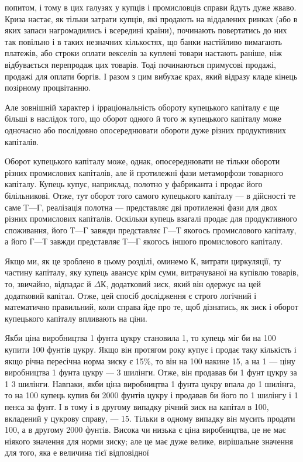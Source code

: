 \parcont{}  %
попитом, і тому в цих галузях у купців і промисловців справи
йдуть дуже жваво. Криза настає, як тільки затрати купців, які
продають на віддалених ринках (або в яких запаси нагромадились
і всередині країни), починають повертатись до них так
повільно і в таких незначних кількостях, що банки настійливо
вимагають платежів, або строки оплати векселів за куплені
товари настають раніше, ніж відбувається перепродаж цих
товарів. Тоді починаються примусові продажі, продажі для
оплати боргів. І разом з цим вибухає крах, який відразу кладе
кінець позірному процвітанню.

Але зовнішній характер і ірраціональність обороту купецького
капіталу є ще більші в наслідок того, що оборот одного й того ж
купецького капіталу може одночасно або послідовно опосереднювати
обороти дуже різних продуктивних капіталів.

Оборот купецького капіталу може, однак, опосереднювати
не тільки обороти різних промислових капіталів, але й протилежні
фази метаморфози товарного капіталу. Купець купує,
наприклад, полотно у фабриканта і продає його білільникові.
Отже, тут оборот того самого купецького капіталу — в дійсності
те саме $Т — Г$, реалізація полотна — представляє дві протилежні
фази для двох різних промислових капіталів. Оскільки
купець взагалі продає для продуктивного споживання, його
$Т — Г$ завжди представляє $Г — Т$ якогось промислового капіталу,
а його $Г — Т$ завжди представляє $Т — Г$ якогось іншого промислового
капіталу.

Якщо ми, як це зроблено в цьому розділі, оминемо $К$, витрати
циркуляції, ту частину капіталу, яку купець авансує крім
суми, витрачуваної на купівлю товарів, то, звичайно, відпадає
й $ΔК$, додатковий зиск, який він одержує на цей додатковий
капітал. Отже, цей спосіб дослідження є строго логічний і математично
правильний, коли справа йде про те, щоб дізнатись,
як зиск і оборот купецького капіталу впливають на ціни.

Якби ціна виробництва 1 фунта цукру становила 1, то купець міг би на 100 купити
100 фунтів цукру. Якщо він протягом року купує і продає таку
кількість і якщо річна пересічна норма зиску є 15\%, то він
на 100 накине 15, а на
1 — ціну виробництва 1 фунта цукру — 3 шилінги.
Отже, він продавав би 1 фунт цукру за 1 3 шилінги.
Навпаки, якби ціна виробництва 1 фунта цукру впала до
1 шилінга, то на 100 купець купив би 2000 фунтів
цукру і продавав би його по 1 шилінгу і 1 пенса за фунт.
І в тому і в другому випадку річний зиск на капітал в 100, вкладений у цукрову справу, — 15.
Тільки в одному випадку він мусить продати 100, а в другому
2000 фунтів. Висока чи низька є ціна виробництва, це не має
ніякого значення для норми зиску; але це має дуже велике,
вирішальне значення для того, яка е величина тієї відповідної
\parbreak{}  %
